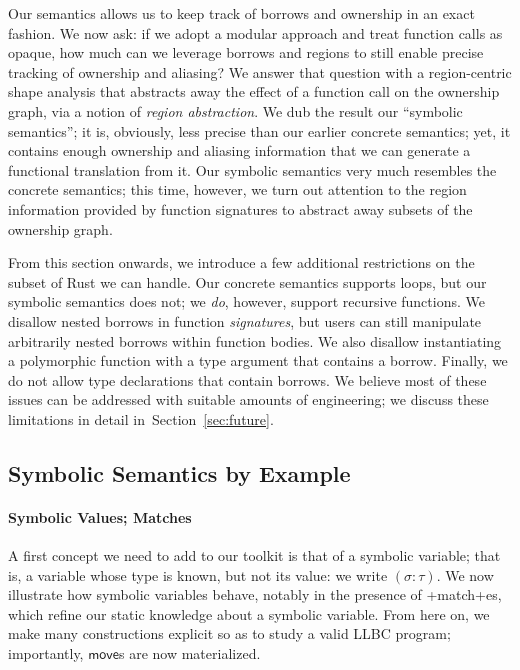 \documentclass[acmsmall,screen]{acmart}
\newcommand{\sref}[1]{Section~\ref{sec:#1}}
\newcommand\kw[1]{\ensuremath{\mathsf{#1}}}
\newcommand\myparagraph[1]{\emph{#1}.\ }
\let\myparagraph\paragraph
\begin{document}
Our semantics allows us to keep track of borrows and ownership in an exact
fashion.
We now ask: if we adopt a modular approach and treat function calls as
opaque, how much can we leverage borrows and regions to still enable precise
tracking of ownership and aliasing?
We answer that question with a
region-centric shape analysis that abstracts away the effect of a function
call on the ownership graph, via a notion of \emph{region abstraction}. We dub the
result our ``symbolic semantics''; it is, obviously, less precise than our
earlier concrete semantics; yet, it contains enough ownership and aliasing
information that we can generate a functional translation from it.
Our symbolic semantics very much resembles the concrete semantics; this
time, however, we turn out attention to the region information provided by
function signatures to
abstract away subsets of the ownership graph.

From this section onwards, we introduce a few additional restrictions on the
subset of Rust we can handle. Our concrete semantics supports loops, but our
symbolic semantics does not; we \emph{do}, however, support recursive functions. We disallow nested
borrows in function \emph{signatures}, but users can still manipulate
arbitrarily nested borrows within function bodies.
We also disallow instantiating a polymorphic function
with a type argument that contains a borrow.
Finally, we do not allow type declarations that contain borrows.
We believe most of these issues can be addressed with suitable amounts of
engineering; we discuss these limitations in detail in~\sref{future}.

\subsection{Symbolic Semantics by Example}
\label{sec:abstraction-examples}

\myparagraph{Symbolic Values; Matches}
A first concept we need to add to our toolkit is that of a symbolic
variable; that is, a variable whose type is known, but not its value: we write
$(\sigma: \tau)$. We now illustrate how symbolic variables
behave, notably in the presence of \li+match+es, which refine our static
knowledge about a symbolic variable.
From here on, we
make many constructions explicit so as to study a valid LLBC program;
importantly, $\kw{move}$s are now materialized.
\end{document}
